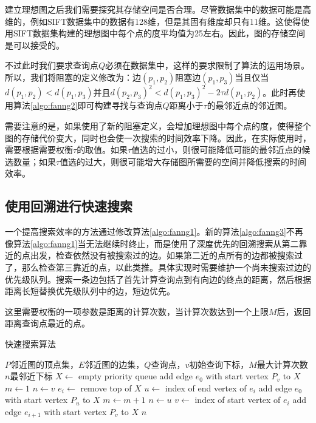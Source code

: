 建立理想图之后我们需要探究其存储空间是否合理。尽管数据集中的数据可能是高维的，例如SIFT\cite{asuncion2007uci}数据集中的数据有128维，但是其固有维度却只有11维\cite{harwood2016fanng}。这使得使用SIFT数据集构建的理想图中每个点的度平均值为25左右。因此，图的存储空间是可以接受的。

不过此时我们要求查询点$Q$必须在数据集中，这样的要求限制了算法的运用场景。所以，我们将阻塞的定义修改为：边$(p_1,p_2)$阻塞边$(p_1,p_3)$当且仅当$d(p_1,p_2)<d(p_1,p_3)$并且$d(p_2,p_3)^2<d(p_1,p_3)^2-2\tau d(p_1,p_2)$。此时再使用算法\ref{algo:fanng2}即可构建寻找与查询点$Q$距离小于$\tau$的最邻近点的邻近图。

需要注意的是，如果使用了新的阻塞定义，会增加理想图中每个点的度，使得整个图的存储代价变大，同时也会使一次搜索的时间效率下降。因此，在实际使用时，需要根据需要权衡$\tau$的取值。如果$\tau$值选的过小，则很可能降低可能的最邻近点的候选数量；如果$\tau$值选的过大，则很可能增大存储图所需要的空间并降低搜索的时间效率。

\subsection{使用回溯进行快速搜索}

一个提高搜索效率的方法通过修改算法\ref{algo:fanng1}。新的算法\ref{algo:fanng3}不再像算法\ref{algo:fanng1}当无法继续时终止，而是使用了深度优先的回溯搜索从第二靠近的点出发，检查依然没有被搜索过的边。如果第二近的点所有的边都被搜索过了，那么检查第三靠近的点，以此类推。具体实现时需要维护一个尚未搜索过边的优先级队列。搜索一条边包括了首先计算查询点到有向边的终点的距离，然后根据距离长短替换优先级队列中的边，短边优先。

这里需要权衡的一项参数是距离的计算次数，当计算次数达到一个上限$M$后，返回距离查询点最近的点。

\begin{algorithm}
	\caption{快速搜索算法\cite{harwood2016fanng}}
	\label{algo:fanng3}
	\begin{algorithmic}[1] %
		\Require $P$邻近图的顶点集，$E$邻近图的边集，$Q$查询点，$v$初始查询下标，$M$最大计算次数 %
		\Ensure $n$最邻近下标 %
		\State $X\leftarrow$ empty priority queue
		\State add edge $e_0$ with start vertex $P_v$ to $X$
		\State $m\leftarrow 1$
		\State $n\leftarrow v$
		\State $e_i\leftarrow$ remove top of $X$
		\State $u\leftarrow$ index of end vertex of $e_i$
		\State add edge $e_0$ with start vertex $P_u$ to $X$
		\State $m\leftarrow m+1$
		\State $n\leftarrow u$
		\EndIf
		\EndIf
		\State $v\leftarrow$ index of start vertex of $e_i$
		\State add edge $e_{i+1}$ with start vertex $P_v$ to $X$
		\EndIf
		\EndWhile
		\Return $n$
	\end{algorithmic}
\end{algorithm}

